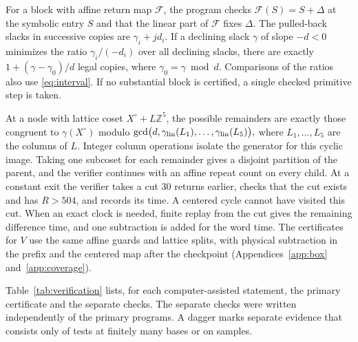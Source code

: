 \documentclass[11pt,reqno]{amsart}
\theoremstyle{remark}
\newcommand{\Z}{\mathbb Z}
\begin{document}
For a block with affine return map \(\mathcal F\), the program checks \(\mathcal F(S)=S+\Delta\) at the symbolic entry \(S\) and that the linear part of \(\mathcal F\) fixes \(\Delta\). The pulled-back slacks in successive copies are \(\gamma_i+jd_i\). If a declining slack \(\gamma\) of slope \(-d<0\) minimizes the ratio \(\gamma_i/(-d_i)\) over all declining slacks, there are exactly \(1+(\gamma-\gamma_0)/d\) legal copies, where \(\gamma_0=\gamma\bmod d\). Comparisons of the ratios also use \eqref{eq:interval}. If no substantial block is certified, a single checked primitive step is taken.

At a node with lattice coset \(X^\circ+L\Z^5\), the possible remainders are exactly those congruent to \(\gamma(X^\circ)\) modulo
\(
 \gcd\bigl(d,\gamma_{\rm lin}(L_1),\ldots,\gamma_{\rm lin}(L_5)\bigr),
\)
where \(L_1,\ldots,L_5\) are the columns of \(L\). Integer column operations isolate the generator for this cyclic image. Taking one subcoset for each remainder gives a disjoint partition of the parent, and the verifier continues with an affine repeat count on every child. At a constant exit the verifier takes a cut \(30\) returns earlier, checks that the cut exists and has \(R>504\), and records its time. A centered cycle cannot have visited this cut. When an exact clock is needed, finite replay from the cut gives the remaining difference time, and one subtraction is added for the word time. The certificates for \(V\) use the same affine guards and lattice splits, with physical subtraction in the prefix and the centered map after the checkpoint (Appendices~\ref{app:box} and~\ref{app:coverage}).

Table~\ref{tab:verification} lists, for each computer-assisted statement, the primary certificate and the separate checks. The separate checks were written independently of the primary programs. A dagger marks separate evidence that consists only of tests at finitely many bases or on samples.
\end{document}

